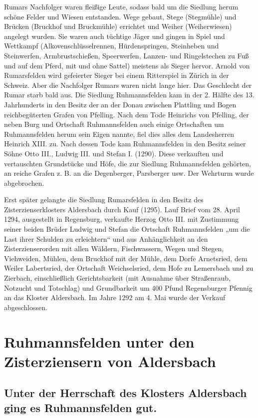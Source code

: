 \documentclass[12pt,a4pager]{book}
\begin{document}
Rumars Nachfolger waren fleißige Leute, sodass bald um die Siedlung herum schöne
Felder und Wiesen entstanden. Wege gebaut, Stege (Stegmühle) und Brücken
(Bruckhof und Bruckmühle) errichtet und Weiher (Weiherwiesen) angelegt wurden.
Sie waren auch tüchtige Jäger und gingen in Spiel und Wettkampf
(Alkovenschlüsselrennen, Hürdenspringen, Steinheben und Steinwerfen,
Armbrustschießen, Speerwerfen, Lanzen- und Ringelstechen zu Fuß und auf dem
Pferd, mit und ohne Sattel) meistens als Sieger hervor. Arnold von Rumarsfelden
wird gefeierter Sieger bei einem Ritterspiel in Zürich in der Schweiz. Aber die
Nachfolger Rumars waren nicht lange hier. Das Geschlecht der Rumar starb bald
aus. Die Siedlung Ruhmannsfelden kam in der 2. Hälfte des 13. Jahrhunderts in
den Besitz der an der Donau zwischen Plattling und Bogen reichbegüterten Grafen
von Pfelling. Nach dem Tode Heinrichs von Pfelling, der neben Burg und Ortschaft
Ruhmannsfelden auch einige Ortschaften um Ruhmannsfelden herum sein Eigen
nannte, fiel dies alles dem Landesherren Heinrich XIII. zu. Nach dessen Tode kam
Ruhmannsfelden in den Besitz seiner Söhne Otto III., Ludwig III. und Stefan I.
(1290). Diese verkauften und vertauschten Grundstücke und Höfe, die zur Siedlung
Ruhmannsfelden gehörten, an reiche Grafen z. B. an die Degenberger, Parsberger
usw. Der Wehrturm wurde abgebrochen.

Erst später gelangte die Siedlung Rumarsfelden in den Besitz des
Zisterzienserklosters Aldersbach durch Kauf (1295). Lauf Brief vom 28. April
1294, ausgestellt in Regensburg, verkaufte Herzog Otto III. mit Zustimmung
seiner beiden Brüder Ludwig und Stefan die Ortschaft Ruhmannsfelden „um die Last
ihrer Schulden zu erleichtern“ und aus Anhänglichkeit an den Zisterzienserorden
mit allen Wäldern, Fischwassern, Wegen und Stegen, Viehweiden, Mühlen, dem
Bruckhof mit der Mühle, dem Dorfe Arnetsried, dem Weiler Labertsried, der
Ortschaft Weichselsried, dem Hofe zu Lemersbach und zu Zierbach, einschließlich
Gerichtsbarkeit (mit Ausnahme über Straßenraub, Notzucht und Totschlag) und
Grundbarkeit um 400 Pfund Regensburger Pfennig an das Kloster Aldersbach. Im
Jahre 1292 am 4. Mai wurde der Verkauf abgeschlossen.

\chapter{Ruhmannsfelden unter den Zisterziensern von Aldersbach}

\section{Unter der Herrschaft des Klosters Aldersbach ging es Ruhmannsfelden gut.}
\end{document}
